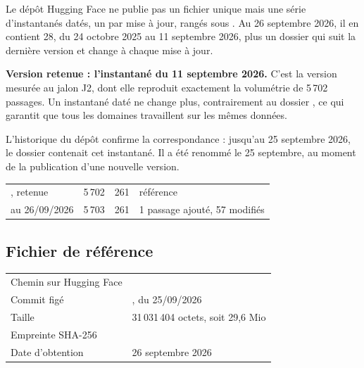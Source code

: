 Le dépôt Hugging Face ne publie pas un fichier unique mais une série d'instantanés datés, un par mise
à jour, rangés sous . Au 26 septembre 2026, il en contient 28, du
24 octobre 2025 au 11 septembre 2026, plus un dossier  qui suit la
dernière version et change à chaque mise à jour.

\textbf{Version retenue : l'instantané du 11 septembre 2026.} C'est la version mesurée au jalon J2,
dont elle reproduit exactement la volumétrie de 5\,702 passages. Un instantané daté ne change plus,
contrairement au dossier , ce qui garantit que tous les domaines travaillent sur les mêmes
données.

L'historique du dépôt confirme la correspondance : jusqu'au 25 septembre 2026, le dossier 
contenait cet instantané. Il a été renommé  le 25 septembre, au moment de la
publication d'une nouvelle version.

\begin{tabletype}
\begin{tabularx}{\textwidth}{@{}L{5.6cm}L{2cm}L{2cm}Y@{}}
\toprule
{} &  &  &  \\
\midrule
{}, retenue & 5\,702 & 261 & référence \\
 au 26/09/2026 & 5\,703 & 261 & 1 passage ajouté, 57 modifiés \\
\bottomrule
\end{tabularx}
\end{tabletype}

\subsection{Fichier de référence}\label{sec:fichier}

\begin{tabletype}
\begin{tabularx}{\textwidth}{@{}L{4cm}Y@{}}
\toprule
{} &  \\
\midrule
Chemin sur Hugging Face &  \\
Commit figé & , du 25/09/2026 \\
Taille & 31\,031\,404 octets, soit 29,6 Mio \\
Empreinte SHA-256 & \newline{} \\
Date d'obtention & 26 septembre 2026 \\
\bottomrule
\end{tabularx}
\end{tabletype}

